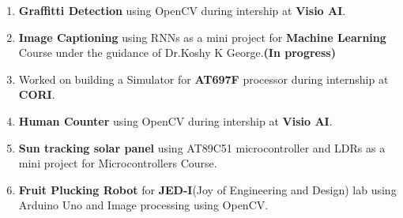 \documentclass[10pt,letterpaper]{article}
\begin{document}
\begin{enumerate}
\parskip=-0.5em

\item \textbf{Graffitti Detection} using OpenCV during intership at \textbf{Visio AI}.
\vspace{1.0em}

\item \textbf{Image Captioning} using RNNs  as a mini project for {\bf Machine Learning} Course under the guidance of Dr.Koshy K George.\textbf{(In progress)}
\vspace{1.0em}

\item Worked on building a Simulator  for \textbf{AT697F} processor during internship at \textbf{CORI}.
\vspace{1.0em}

\item \textbf{Human Counter} using OpenCV during intership at \textbf{Visio AI}.
\vspace{1.0em}

 \item \textbf{Sun tracking solar panel} using AT89C51 microcontroller and LDRs as a mini project for Microcontrollers Course.
\vspace{1.0em}

\item\textbf{Fruit Plucking Robot} for \textbf{JED-I}(Joy of Engineering and Design) lab using Arduino Uno and Image processing using OpenCV.

\end{enumerate}
\end{document}
